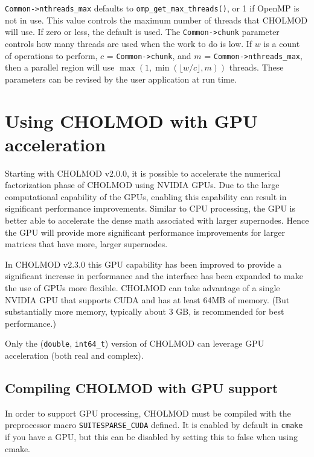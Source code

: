 \documentclass[11pt]{article}
\begin{document}
\verb'Common->nthreads_max' defaults to \verb'omp_get_max_threads()', or 1 if
OpenMP is not in use.  This value controls the maximum number of threads that
CHOLMOD will use.  If zero or less, the default is used.  The
\verb'Common->chunk' parameter controls how many threads are used when the work
to do is low.  If $w$ is a count of operations to perform, $c$ =
\verb'Common->chunk', and $m$ = \verb'Common->nthreads_max', then a parallel
region will use $\max (1, \min (\lfloor w/c \rfloor, m))$ threads.  These
parameters can be revised by the user application at run time.

\section{Using CHOLMOD with GPU acceleration}

Starting with CHOLMOD v2.0.0, it is possible to accelerate the numerical
factorization phase of CHOLMOD using NVIDIA GPUs.  Due to the large
computational capability of the GPUs, enabling this capability can result in
significant performance improvements.  Similar to CPU processing, the GPU is
better able to accelerate the dense math associated with larger supernodes.
Hence the GPU will provide more significant performance improvements for larger
matrices that have more, larger supernodes.

In CHOLMOD v2.3.0 this GPU capability has been improved to provide a
significant increase in performance and the interface has been expanded to make
the use of GPUs more flexible.  CHOLMOD can take advantage of a single NVIDIA
GPU that supports CUDA and has at least 64MB of memory.  (But substantially
more memory, typically about 3 GB, is recommended for best performance.)

Only the ({\tt double}, {\tt int64\_t}) version of CHOLMOD can leverage GPU
acceleration (both real and complex).

\subsection{Compiling CHOLMOD with GPU support}

In order to support GPU processing, CHOLMOD must be compiled with the
preprocessor macro \verb'SUITESPARSE_CUDA' defined.  It is enabled by default
in {\tt cmake} if you have a GPU, but this can be disabled by setting this to
false when using cmake.
\end{document}
